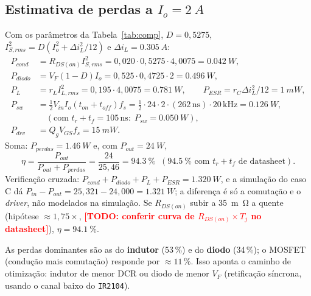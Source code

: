 \documentclass[11pt,a4paper]{article}
\newcommand{\TODO}[1]{\textcolor{red}{\textbf{[TODO: #1]}}}
\newcommand{\fs}{f_s}
\newcommand{\Vin}{V_{in}}
\newcommand{\dIL}{\Delta i_L}
\begin{document}
\subsection{Estimativa de perdas a $I_o=\SI{2}{A}$}
Com os par\^ametros da Tabela~\ref{tab:comp}, $D=0{,}5275$, $I_{S,rms}^2=D(I_o^2+\dIL^2/12)$ e $\dIL=\SI{0,305}{A}$:
\begin{align}
 P_{cond}&=R_{DS(on)}I_{S,rms}^2=0{,}020\cdot0{,}5275\cdot4{,}0075=\SI{0,042}{W},\\
 P_{diodo}&=V_F(1-D)I_o=0{,}525\cdot0{,}4725\cdot2=\SI{0,496}{W},\\
 P_{L}&=r_L I_{L,rms}^2=0{,}195\cdot4{,}0075=\SI{0,781}{W},\qquad
 P_{ESR}=r_C\dIL^2/12=\SI{1}{mW},\\
 P_{sw}&=\tfrac12\Vin I_o(t_{on}+t_{off})\fs=\tfrac12\cdot24\cdot2\cdot(262\,\text{ns})\cdot20\,\text{kHz}=\SI{0,126}{W},\\
 &\quad(\text{com }t_r{+}t_f=105\,\text{ns}:\;P_{sw}=\SI{0,050}{W}),\\
 P_{drv}&=Q_gV_{GS}\fs=\SI{15}{mW}.
\end{align}
Soma: $P_{perdas}=\SI{1,46}{W}$ e, com $P_{out}=\SI{24}{W}$,
\begin{equation}
 \eta=\frac{P_{out}}{P_{out}+P_{perdas}}=\frac{24}{25{,}46}=\SI{94,3}{\percent}\;\;(\SI{94,5}{\percent}\text{ com }t_r{+}t_f\text{ de datasheet}).
\end{equation}
Verifica\c{c}\~ao cruzada: $P_{cond}+P_{diodo}+P_L+P_{ESR}=\SI{1,320}{W}$, e a simula\c{c}\~ao do caso C d\'a $P_{in}-P_{out}=25{,}321-24{,}000=\SI{1,321}{W}$; a diferen\c{c}a \'e s\'o a comuta\c{c}\~ao e o \emph{driver}, n\~ao modelados na simula\c{c}\~ao. Se $R_{DS(on)}$ subir a \SI{35}{m\ohm} a quente (hip\'otese $\approx1{,}75\times$, \TODO{conferir curva de $R_{DS(on)}\times T_j$ no datasheet}), $\eta=\SI{94,1}{\percent}$.

As perdas dominantes s\~ao as do \textbf{indutor} (53\,\%) e do \textbf{diodo} (34\,\%); o MOSFET (condu\c{c}\~ao mais comuta\c{c}\~ao) responde por $\approx11\,\%$. Isso aponta o caminho de otimiza\c{c}\~ao: indutor de menor DCR ou diodo de menor $V_F$ (retifica\c{c}\~ao s\'incrona, usando o canal baixo do \texttt{IR2104}).
\end{document}
